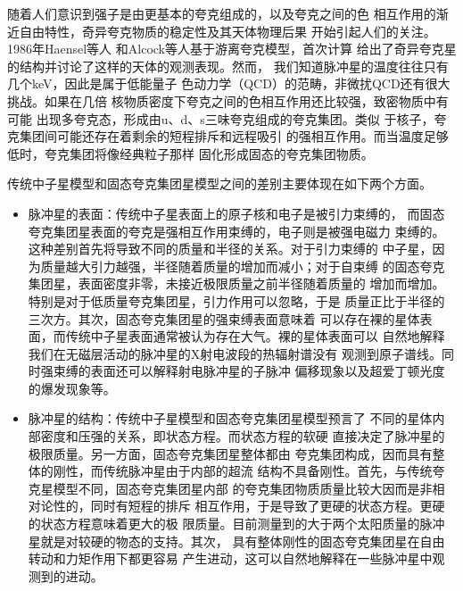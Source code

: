 随着人们意识到强子是由更基本的夸克组成的，以及夸克之间的色
相互作用的渐近自由特性，奇异夸克物质的稳定性及其天体物理后果
开始引起人们的关注\supercite{wit84}。1986年Haensel等人\supercite{hzs86}
和Alcock等人\supercite{afo86}基于游离夸克模型，首次计算
给出了奇异夸克星的结构并讨论了这样的天体的观测表现。然而，
我们知道脉冲星的温度往往只有几个keV，因此是属于低能量子
色动力学（QCD）的范畴，非微扰QCD还有很大挑战。如果在几倍
核物质密度下夸克之间的色相互作用还比较强，致密物质中有可能
出现多夸克态，形成由u、d、s三味夸克组成的夸克集团。类似
于核子，夸克集团间可能还存在着剩余的短程排斥和远程吸引
的强相互作用。而当温度足够低时，夸克集团将像经典粒子那样
固化形成固态的夸克集团物质。

传统中子星模型和固态夸克集团星模型之间的差别主要体现在如下两个方面。
\begin{itemize}
\item 脉冲星的表面：传统中子星表面上的原子核和电子是被引力束缚的，
而固态夸克集团星表面的夸克是强相互作用束缚的，电子则是被强电磁力
束缚的。这种差别首先将导致不同的质量和半径的关系。对于引力束缚的
中子星，因为质量越大引力越强，半径随着质量的增加而减小；对于自束缚
的固态夸克集团星，表面密度非零，未接近极限质量之前半径随着质量的
增加而增加。特别是对于低质量夸克集团星，引力作用可以忽略，于是
质量正比于半径的三次方。其次，固态夸克集团星的强束缚表面意味着
可以存在裸的星体表面，而传统中子星表面通常被认为存在大气。裸的星体表面可以
自然地解释我们在无磁层活动的脉冲星的X射电波段的热辐射谱没有
观测到原子谱线。同时强束缚的表面还可以解释射电脉冲星的子脉冲
偏移现象以及超爱丁顿光度的爆发现象等。
\item 脉冲星的结构：传统中子星模型和固态夸克集团星模型预言了
不同的星体内部密度和压强的关系，即状态方程。而状态方程的软硬
直接决定了脉冲星的极限质量。另一方面，固态夸克集团星整体都由
夸克集团构成，因而具有整体的刚性，而传统脉冲星由于内部的超流
结构不具备刚性。首先，与传统夸克星模型不同，固态夸克集团星内部
的夸克集团物质质量比较大因而是非相对论性的，同时有短程的排斥
相互作用，于是导致了更硬的状态方程。更硬的状态方程意味着更大的极
限质量。目前测量到的大于两个太阳质量的脉冲星就是对较硬的物态的支持。其次，
具有整体刚性的固态夸克集团星在自由转动和力矩作用下都更容易
产生进动，这可以自然地解释在一些脉冲星中观测到的进动。
\end{itemize}

